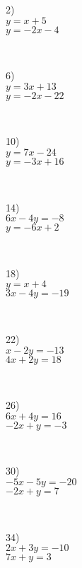 \begin{multicols}{4}
  2)\\ 
  $y = x + 5$\\
	$y = - 2 x - 4$\par
  ~\par
  6)\\ 
  $y = 3 x + 13$\\
	$y = - 2 x - 22$\par
  ~\par
  10)\\ 
  $y = 7 x - 24$\\
	$y = - 3 x + 16$\par
  ~\par
  14)\\ 
  $6 x - 4 y = - 8$\\
  $y = - 6 x + 2$\par
  ~\par
  18)\\ 
  $y = x + 4$\\
	$3 x - 4 y = - 19$\par
  ~\par
  22)\\ 
  $x - 2 y = - 13$\\
  $4 x + 2 y = 18$\par
  ~\par
  26)\\ 
  $6 x + 4 y = 16$\\
  $- 2 x + y = - 3$\par
  ~\par
  30)\\ 
  $- 5 x - 5 y = - 20$\\
  $- 2 x + y = 7$\par
  ~\par
  34)\\ 
  $2 x + 3 y = - 10$\\
  $7 x + y = 3$\par
  ~\par
  

\end{multicols}
